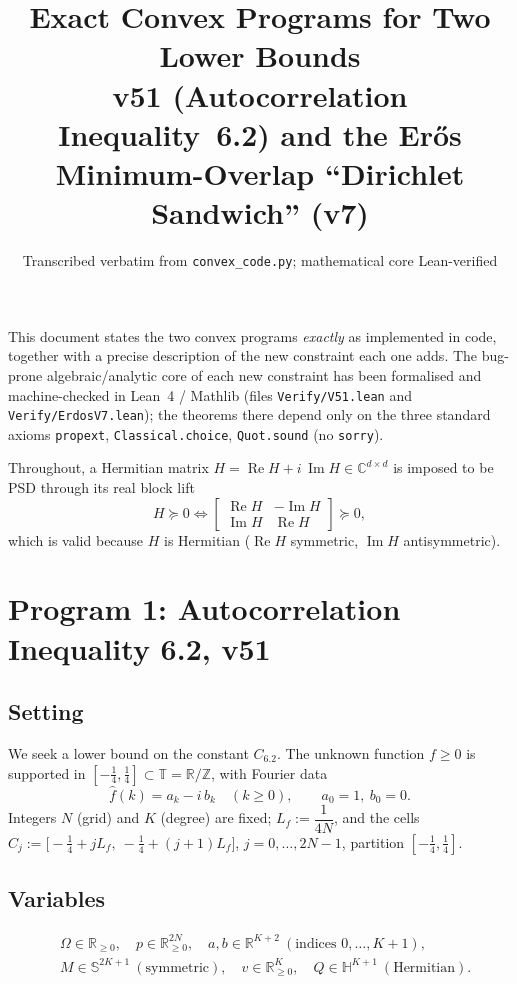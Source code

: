\documentclass[11pt]{article}
\title{Exact Convex Programs for Two Lower Bounds\\[2pt]
\large v51 (Autocorrelation Inequality~6.2) and the Er\H{o}s Minimum-Overlap ``Dirichlet Sandwich'' (v7)}
\author{Transcribed verbatim from \texttt{convex\_code.py}; mathematical core Lean-verified}
\date{}
\newcommand{\R}{\mathbb{R}}
\newcommand{\C}{\mathbb{C}}
\newcommand{\Z}{\mathbb{Z}}
\newcommand{\T}{\mathbb{T}}
\newcommand{\re}{\operatorname{Re}}
\newcommand{\im}{\operatorname{Im}}
\newcommand{\psdge}{\succeq 0}
\begin{document}
\maketitle

\noindent
This document states the two convex programs \emph{exactly} as implemented in
code, together with a precise description of the new constraint each one adds.
The bug-prone algebraic/analytic core of each new constraint has been
formalised and machine-checked in Lean~4 / Mathlib (files
\texttt{Verify/V51.lean} and \texttt{Verify/ErdosV7.lean}); the theorems there
depend only on the three standard axioms \texttt{propext},
\texttt{Classical.choice}, \texttt{Quot.sound} (no \texttt{sorry}).

Throughout, a Hermitian matrix $H=\re H + i\,\im H\in\C^{d\times d}$ is imposed
to be PSD through its real block lift
\[
  H\psdge \iff
  \begin{bmatrix} \re H & -\im H\\ \im H & \re H\end{bmatrix}\psdge ,
\]
which is valid because $H$ is Hermitian ($\re H$ symmetric, $\im H$
antisymmetric).

\section{Program 1: Autocorrelation Inequality 6.2, v51}

\subsection*{Setting}
We seek a lower bound on the constant $C_{6.2}$. The unknown function
$f\ge 0$ is supported in $[-\tfrac14,\tfrac14]\subset\T=\R/\Z$, with Fourier
data
\[
  \hat f(k)=a_k-i\,b_k\quad(k\ge 0),\qquad a_0=1,\ b_0=0 .
\]
Integers $N$ (grid) and $K$ (degree) are fixed; $L_f:=\dfrac{1}{4N}$, and the
cells $C_j:=\bigl[-\tfrac14+jL_f,\ -\tfrac14+(j+1)L_f\bigr]$,
$j=0,\dots,2N-1$, partition $[-\tfrac14,\tfrac14]$.

\subsection*{Variables}
\[
\begin{aligned}
&\Omega\in\R_{\ge 0}, \quad
 p\in\R^{2N}_{\ge 0}, \quad
 a,b\in\R^{K+2}\ (\text{indices }0,\dots,K+1),\\
&M\in\mathbb{S}^{2K+1}\ (\text{symmetric}),\quad
 v\in\R^{K}_{\ge 0},\quad
 Q\in\mathbb{H}^{K+1}\ (\text{Hermitian}).
\end{aligned}
\]
\end{document}
